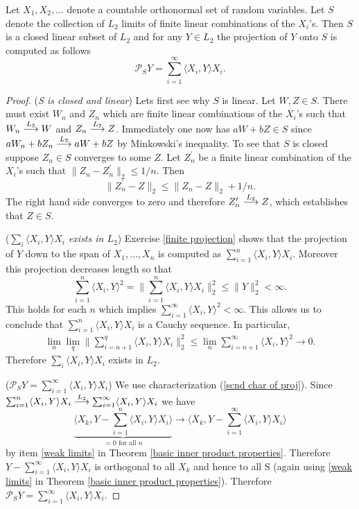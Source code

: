 \begin{theorem} \label{computing projections}
Let $X_1, X_2, \ldots $ denote a countable orthonormal set of random variables. Let $S$ denote the collection of $L_2$ limits of finite linear combinations of the $X_i$'s. Then $S$ is a closed linear subset of $L_2$ and for any $Y\in L_2$ the projection of $Y$ onto $S$ is computed as follows
\[
\mathcal P_S Y = \sum_{i=1}^\infty \langle X_i, Y\rangle X_i.
\]
\end{theorem}
\begin{proof}
({\sl S is closed and linear}) Lets first see why $S$ is linear. Let $W, Z \in S$. There must exist $W_n$ and $Z_n$ which are finite linear combinations of the $X_i$'s such that  $W_n \overset{\small L_2} \longrightarrow W$ and $Z_n\overset{\small L_2} \longrightarrow Z$. Immediately one now has $aW + bZ\in S$ since  $aW_n + bZ_n \overset{\small L_2} \longrightarrow aW + bZ$  by Minkowski’s inequality. To see that $S$ is closed suppose $Z_n\in S$ converges to some $Z$. Let $Z^\prime_n$ be a finite linear combination of the $X_i$'s such that $\|Z_n - Z^\prime_n \|_2\leq 1/n$. Then 
\[ \|Z_n^\prime - Z \|_2 \leq \|Z_n - Z \|_2 + 1/n. \]
The right hand side converges to zero and therefore $Z_n^\prime \overset{\small L_2} \longrightarrow Z$, which establishes that $Z\in S$.


({\sl $\sum_{i} \langle X_i, Y\rangle X_i$ exists in $L_2$}) Exercise \ref{finite projection} shows that the projection of $Y$ down to the span of $X_1, \ldots, X_n$ is computed as $\sum_{i=1}^n \langle X_i, Y \rangle X_i$. Moreover this projection decreases length so that 
\[ \textstyle\sum_{i=1}^n \langle X_i, Y \rangle^2 = \bigl\| \textstyle\sum_{i=1}^n \langle X_i, Y \rangle X_i\bigl\|_2^2\leq \| Y \|_2^2<\infty. \]
This holds for each $n$ which implies $\sum_{i=1}^\infty \langle X_i, Y \rangle^2 <\infty$. This allows us to conclude that $\sum_{i=1}^n \langle X_i, Y\rangle X_i$ is a Cauchy sequence. In particular, 
\begin{align*}
\lim_{n}\lim_q\bigl\|{\textstyle\sum_{i=n+1}^q} \langle X_i, Y\rangle X_i \bigr\|_2^2 \leq \lim_{n} \textstyle\sum_{i=n+1}^\infty \langle X_i, Y \rangle^2\rightarrow 0.
\end{align*}
Therefore $\sum_{i} \langle X_i, Y\rangle X_i$ exists in $L_2$.

({\sl $\mathcal P_S Y = \sum_{i=1}^\infty  \langle X_i, Y\rangle X_i$}) We use characterization (\ref{scnd char of proj}). Since $\sum_{i=1}^n \langle X_i, Y\rangle X_i\overset{\small L_2} \longrightarrow \sum_{i=1}^\infty \langle X_i, Y\rangle X_i$ we have
\[ \underbrace{\bigl\langle X_k, Y - \textstyle\sum_{i=1}^n \langle X_i, Y\rangle X_i \bigl\rangle}_{\text{$=0$ for all $n$}} \rightarrow  \bigl\langle X_k,Y - \textstyle\sum_{i=1}^\infty \langle X_i, Y\rangle X_i\bigr\rangle \]
by item \ref{weak limits} in Theorem \ref{basic inner product properties}. Therefore $Y - \sum_{i=1}^\infty \langle X_i, Y\rangle X_i$ is orthogonal to all $X_k$ and hence to all S (again using \ref{weak limits} in Theorem \ref{basic inner product properties}). Therefore $\mathcal P_S Y = \sum_{i=1}^\infty \langle X_i, Y\rangle X_i$.
\end{proof}


